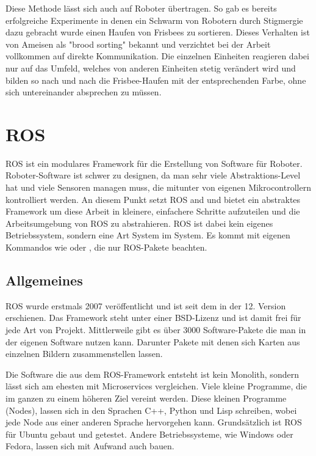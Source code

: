 Diese Methode lässt sich auch auf Roboter übertragen.
So gab es bereits erfolgreiche Experimente in denen ein Schwarm von Robotern durch Stigmergie dazu gebracht wurde einen Haufen von Frisbees zu sortieren.
Dieses Verhalten ist von Ameisen als "brood sorting" bekannt und verzichtet bei der Arbeit vollkommen auf direkte Kommunikation.
Die einzelnen Einheiten reagieren dabei nur auf das Umfeld, welches von anderen Einheiten stetig verändert wird und bilden so nach und nach die Frisbee-Haufen mit der entsprechenden Farbe, ohne sich untereinander absprechen zu müssen.\cite{Stigmergie2}\cite{Beckers94fromlocal}\cite{Stigmergie3}

\section{ROS}

\ac{ROS} ist ein modulares Framework für die Erstellung von Software für Roboter. Roboter-Software ist schwer zu designen, da man sehr viele Abstraktions-Level hat und viele Sensoren managen muss, die mitunter von eigenen Mikrocontrollern kontrolliert werden. An diesem Punkt setzt \ac{ROS} and und bietet ein abstraktes Framework um diese Arbeit in kleinere, einfachere Schritte aufzuteilen und die Arbeitsumgebung von \ac{ROS} zu abstrahieren. \ac{ROS} ist dabei kein eigenes Betriebssystem, sondern eine Art System im System. Es kommt mit eigenen Kommandos wie  oder , die nur \ac{ROS}-Pakete beachten.

\subsection{Allgemeines}

\ac{ROS} wurde erstmals 2007 veröffentlicht und ist seit dem in der 12. Version erschienen. Das Framework steht unter einer BSD-Lizenz und ist damit frei für jede Art von Projekt. Mittlerweile gibt es über 3000 Software-Pakete die man in der eigenen Software nutzen kann. Darunter Pakete mit denen sich Karten aus einzelnen Bildern zusammenstellen lassen\cite{ROS_SLAM}.

Die Software die aus dem \ac{ROS}-Framework entsteht ist kein Monolith, sondern lässt sich am ehesten mit Microservices vergleichen. Viele kleine Programme, die im ganzen zu einem höheren Ziel vereint werden. Diese kleinen Programme (Nodes), lassen sich in den Sprachen C++, Python und Lisp schreiben, wobei jede Node aus einer anderen Sprache hervorgehen kann. Grundsätzlich ist \ac{ROS} für Ubuntu gebaut und getestet. Andere Betriebssysteme, wie Windows oder Fedora, lassen sich mit Aufwand auch bauen.

